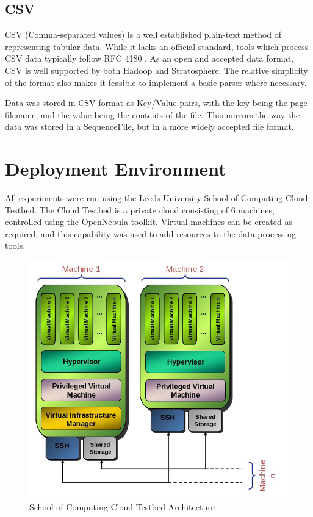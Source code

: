 \subsection{CSV}
CSV (Comma-separated values) is a well established plain-text method of representing tabular data. While it lacks an official standard, tools which process CSV data typically follow RFC 4180 \cite{rfc4180}. As an open and accepted data format, CSV is well supported by both Hadoop and Stratosphere. The relative simplicity of the format also makes it feasible to implement a basic parser where necessary. 

Data was stored in CSV format as Key/Value pairs, with the key being the page filename, and the value being the contents of the file. This mirrors the way the data was stored in a SequenceFile, but in a more widely accepted file format. 

\section{Deployment Environment}
All experiments were run using the Leeds University School of Computing Cloud Testbed. The Cloud Testbed is a private cloud consisting of 6 machines, controlled using the OpenNebula toolkit. Virtual machines can be created as required, and this capability was used to add resources to the data processing tools. 

\begin{figure}[H]
\centering
\includegraphics[scale=0.3]{resources/CloudTestBed.png}
\caption{School of Computing Cloud Testbed Architecture}
\end{figure}

